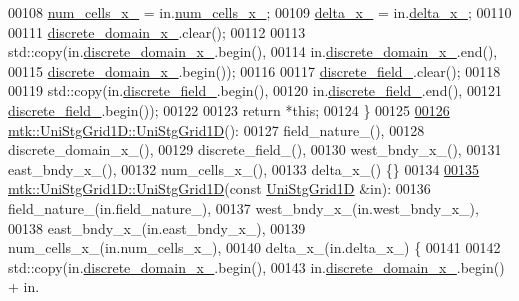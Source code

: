 \begin{DoxyCode}
00108   \hyperlink{classmtk_1_1UniStgGrid1D_afa43750db0029b7454aef343759e7097}{num\_cells\_x\_} = in.\hyperlink{classmtk_1_1UniStgGrid1D_afa43750db0029b7454aef343759e7097}{num\_cells\_x\_};
00109   \hyperlink{classmtk_1_1UniStgGrid1D_a12577bbe0b88e9a0ac9b2267f2fcc48c}{delta\_x\_} = in.\hyperlink{classmtk_1_1UniStgGrid1D_a12577bbe0b88e9a0ac9b2267f2fcc48c}{delta\_x\_};
00110 
00111   \hyperlink{classmtk_1_1UniStgGrid1D_a0a1f9c00e21659e05f414dd97e2a52e3}{discrete\_domain\_x\_}.clear();
00112 
00113   std::copy(in.\hyperlink{classmtk_1_1UniStgGrid1D_a0a1f9c00e21659e05f414dd97e2a52e3}{discrete\_domain\_x\_}.begin(),
00114             in.\hyperlink{classmtk_1_1UniStgGrid1D_a0a1f9c00e21659e05f414dd97e2a52e3}{discrete\_domain\_x\_}.end(),
00115             \hyperlink{classmtk_1_1UniStgGrid1D_a0a1f9c00e21659e05f414dd97e2a52e3}{discrete\_domain\_x\_}.begin());
00116 
00117   \hyperlink{classmtk_1_1UniStgGrid1D_a7379a5c6d16210cdd61ffa731bc47edc}{discrete\_field\_}.clear();
00118 
00119   std::copy(in.\hyperlink{classmtk_1_1UniStgGrid1D_a7379a5c6d16210cdd61ffa731bc47edc}{discrete\_field\_}.begin(),
00120             in.\hyperlink{classmtk_1_1UniStgGrid1D_a7379a5c6d16210cdd61ffa731bc47edc}{discrete\_field\_}.end(),
00121             \hyperlink{classmtk_1_1UniStgGrid1D_a7379a5c6d16210cdd61ffa731bc47edc}{discrete\_field\_}.begin());
00122 
00123   \textcolor{keywordflow}{return} *\textcolor{keyword}{this};
00124 \}
00125 
\hypertarget{mtk__uni__stg__grid__1d_8cc_source_l00126}{}\hyperlink{classmtk_1_1UniStgGrid1D_ab0c1bb8afad2420fdb4434eb21bdec82}{00126} \hyperlink{classmtk_1_1UniStgGrid1D_ab0c1bb8afad2420fdb4434eb21bdec82}{mtk::UniStgGrid1D::UniStgGrid1D}():
00127     field\_nature\_(),
00128     discrete\_domain\_x\_(),
00129     discrete\_field\_(),
00130     west\_bndy\_x\_(),
00131     east\_bndy\_x\_(),
00132     num\_cells\_x\_(),
00133     delta\_x\_() \{\}
00134 
\hypertarget{mtk__uni__stg__grid__1d_8cc_source_l00135}{}\hyperlink{classmtk_1_1UniStgGrid1D_a56d698e803070d96601b46f470bfef0b}{00135} \hyperlink{classmtk_1_1UniStgGrid1D_ab0c1bb8afad2420fdb4434eb21bdec82}{mtk::UniStgGrid1D::UniStgGrid1D}(\textcolor{keyword}{const} 
      \hyperlink{classmtk_1_1UniStgGrid1D}{UniStgGrid1D} &in):
00136     field\_nature\_(in.field\_nature\_),
00137     west\_bndy\_x\_(in.west\_bndy\_x\_),
00138     east\_bndy\_x\_(in.east\_bndy\_x\_),
00139     num\_cells\_x\_(in.num\_cells\_x\_),
00140     delta\_x\_(in.delta\_x\_) \{
00141 
00142     std::copy(in.\hyperlink{classmtk_1_1UniStgGrid1D_a0a1f9c00e21659e05f414dd97e2a52e3}{discrete\_domain\_x\_}.begin(),
00143               in.\hyperlink{classmtk_1_1UniStgGrid1D_a0a1f9c00e21659e05f414dd97e2a52e3}{discrete\_domain\_x\_}.begin() + in.

\end{DoxyCode}
